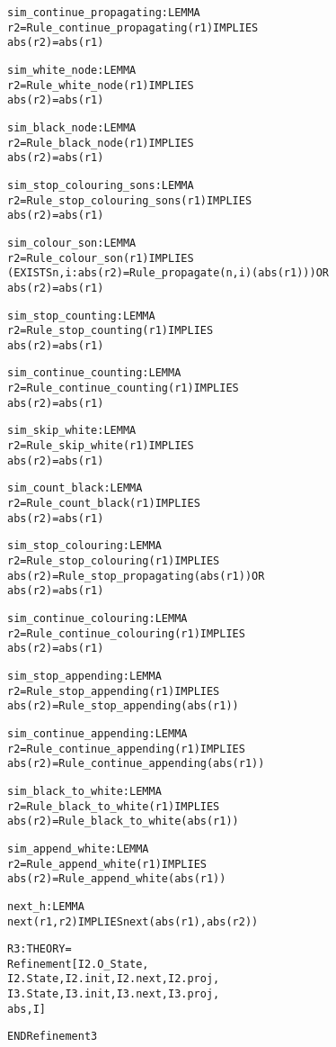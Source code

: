 \begin{alltt}
  sim_continue_propagating : LEMMA
    r2 = Rule_continue_propagating(r1) IMPLIES
      abs(r2) = abs(r1)

  sim_white_node : LEMMA
    r2 = Rule_white_node(r1) IMPLIES
      abs(r2) = abs(r1)

  sim_black_node : LEMMA
    r2 = Rule_black_node(r1) IMPLIES
      abs(r2) = abs(r1)
  
  sim_stop_colouring_sons : LEMMA
    r2 = Rule_stop_colouring_sons(r1) IMPLIES
      abs(r2) = abs(r1)

  sim_colour_son : LEMMA
    r2 = Rule_colour_son(r1) IMPLIES
      (EXISTS n,i: abs(r2) = Rule_propagate(n,i)(abs(r1))) OR
      abs(r2) = abs(r1)

  sim_stop_counting : LEMMA
    r2 = Rule_stop_counting(r1) IMPLIES
      abs(r2) = abs(r1)

  sim_continue_counting : LEMMA
    r2 = Rule_continue_counting(r1) IMPLIES
      abs(r2) = abs(r1)

  sim_skip_white : LEMMA
    r2 = Rule_skip_white(r1) IMPLIES
      abs(r2) = abs(r1)

  sim_count_black : LEMMA
    r2 = Rule_count_black(r1) IMPLIES
      abs(r2) = abs(r1)

  sim_stop_colouring : LEMMA
    r2 = Rule_stop_colouring(r1) IMPLIES
      abs(r2) = Rule_stop_propagating(abs(r1)) OR
      abs(r2) = abs(r1)

  sim_continue_colouring : LEMMA
    r2 = Rule_continue_colouring(r1) IMPLIES
      abs(r2) = abs(r1)

  sim_stop_appending : LEMMA
    r2 = Rule_stop_appending(r1) IMPLIES
      abs(r2) = Rule_stop_appending(abs(r1))

  sim_continue_appending : LEMMA
    r2 = Rule_continue_appending(r1) IMPLIES
      abs(r2) = Rule_continue_appending(abs(r1))

  sim_black_to_white : LEMMA
    r2 = Rule_black_to_white(r1) IMPLIES
      abs(r2) = Rule_black_to_white(abs(r1))

  sim_append_white : LEMMA
    r2 = Rule_append_white(r1) IMPLIES
      abs(r2) = Rule_append_white(abs(r1))

  next_h : LEMMA
    next(r1,r2) IMPLIES next(abs(r1),abs(r2))

  R3 : THEORY = 
    Refinement[I2.O_State,
      I2.State,I2.init,I2.next,I2.proj,
      I3.State,I3.init,I3.next,I3.proj,
      abs,I]      

END Refinement3
\end{alltt}


